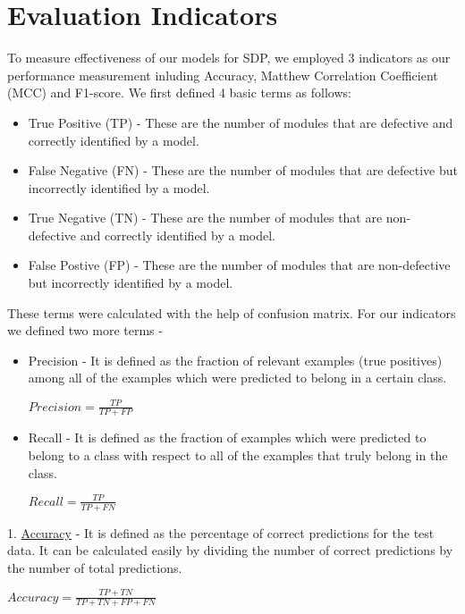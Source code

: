 \section{Evaluation Indicators}
To measure effectiveness of our models for SDP, we employed
3 indicators as our performance measurement inluding Accuracy, Matthew Correlation Coefficient (MCC) and F1-score.\cite{xu2021comprehensive} \newline
We first defined 4 basic terms as follows:
\begin{itemize}
    \item True Positive (TP) - These are the number of modules that are defective and correctly identified by a model.
    \item False Negative (FN) - These are the number of modules that are defective but incorrectly identified by a model.
    \item True Negative (TN) - These are the number of modules that are non-defective and correctly identified by a model.
    \item False Postive (FP) - These are the number of modules that are non-defective but incorrectly identified by a model.
    \newline
\end{itemize}
These terms were calculated with the help of confusion matrix. For our indicators we defined two more terms -\newline

\begin{itemize}
    \item Precision - It is defined as the fraction of relevant examples (true positives) among all of the examples which were predicted to belong in a certain class.
    \begin{center}
    $ Precision = \frac{TP}{TP + FP}$
    \end{center}

    \item Recall - It is defined as the fraction of examples which were predicted to belong to a class with respect to all of the examples that truly belong in the class.
    \begin{center}
    $ Recall = \frac{TP}{TP + FN}$
    \end{center}
    \newline
\end{itemize}

1. \underline{Accuracy} - It is defined as the percentage of correct predictions for the test data. It can be calculated easily by dividing the number of correct predictions by the number of total predictions.
\begin{center}
    $Accuracy = \frac{TP+TN}{TP+TN+FP+FN}$\newline
\end{center}

